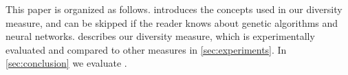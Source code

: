 This paper is organized as follows.  introduces the concepts used in our diversity measure, and can be skipped if the reader knows about genetic algorithms and neural networks.  describes our diversity measure, which is experimentally evaluated and compared to other measures in \cref{sec:experiments}. In \cref{sec:conclusion} we evaluate \dia.

